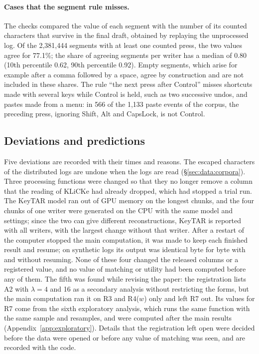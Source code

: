 \paragraph{Cases that the segment rule misses.}
The checks compared the value of each segment with the number of its counted characters that survive in the final
draft, obtained by replaying the unprocessed log. Of the 2,381,444 segments with at least one counted press, the two
values agree for 77.1\%; the share of agreeing segments per writer has a median of 0.80 (10th percentile 0.62, 90th
percentile 0.92). Empty segments, which arise for example after a comma followed by a space, agree by construction
and are not included in these shares.
The rule ``the next press after Control'' misses shortcuts made with several keys while Control is held,
such as two successive undos, and pastes made from a menu: in 566 of the 1,133 paste events of the corpus, the
preceding press, ignoring Shift, Alt and CapsLock, is not Control.

\subsection{Deviations and predictions}
\label{app:checks:deviations}

Five deviations are recorded with their times and reasons. The escaped characters of the distributed logs are undone
when the logs are read (\S\ref{sec:data:corpora}). Three processing functions were changed so that they no longer
remove a column that the reading of KLiCKe had already dropped, which had stopped a trial run. The KeyTAR model ran out
of GPU memory on the longest chunks, and the four chunks of one writer were generated on the CPU with the same model
and settings; since the two can give different reconstructions, KeyTAR is reported with all writers, with the largest change without that writer. After
a restart of the computer stopped the main computation, it was made to keep each finished result and resume; on
synthetic logs its output was identical byte for byte with and without resuming. None of these four changed the
released columns or a registered value, and no value of matching or utility had been computed before any of them. The
fifth was found while revising the paper: the registration lists A2 with $\lambda = 4$ and 16 as a secondary analysis
without restricting the forms, but the main computation ran it on R3 and R4($w$) only and left R7 out. Its values for R7
come from the sixth exploratory analysis, which runs the same function with the same sample and resamples, and were
computed after the main results (Appendix~\ref{app:exploratory}). Details that
the registration left open were decided before the data were opened or before any value of matching was seen, and are
recorded with the code.

